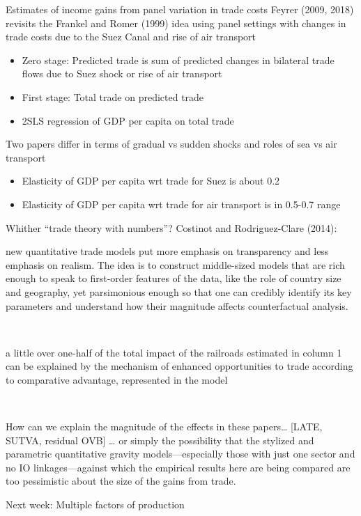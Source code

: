 \documentclass[10pt,notes=hide,aspectratio=169]{beamer}
\begin{document}
\begin{frame}{Estimates of income gains from panel variation in trade costs}
Feyrer (2009, 2018) revisits the Frankel and Romer (1999) idea using 
panel settings with changes in trade costs due to the Suez Canal and rise of air transport
\begin{itemize}
	\item Zero stage: Predicted trade is sum of predicted changes in bilateral trade flows due to Suez shock or rise of air transport
	\item First stage: Total trade on predicted trade
	\item 2SLS regression of GDP per capita on total trade
\end{itemize}
Two papers differ in terms of gradual vs sudden shocks and roles of sea vs air transport \\
\begin{itemize}
	\item Elasticity of GDP per capita wrt trade for Suez is about 0.2
	\item Elasticity of GDP per capita wrt trade for air transport is in 0.5-0.7 range
\end{itemize}
\end{frame}
\begin{frame}{Whither ``trade theory with numbers''?}
Costinot and Rodriguez-Clare (2014): \\
{\small
new quantitative trade models put more emphasis on transparency and less emphasis on realism. The idea is to construct middle-sized models that are rich enough to speak to first-order features of the data, like the role of country size and geography, yet parsimonious enough so that one can credibly identify its key parameters and understand how their magnitude affects counterfactual analysis.\par}
 \\
{\small a little over one-half of the total impact of the railroads estimated in column 1 can be explained by the mechanism of enhanced opportunities to trade according to comparative advantage, represented in the model\par}
 \\
{\small How can we explain the magnitude of the effects in these papers\dots
[LATE, SUTVA, residual OVB]
\dots
or simply the possibility that the stylized and parametric quantitative gravity models—especially those with just one sector and no IO linkages—against which the empirical results here are being compared are too pessimistic about the size of the gains from trade.
\par}
\end{frame}
\begin{frame}[plain]
Next week: Multiple factors of production
\end{frame}
\end{document}
